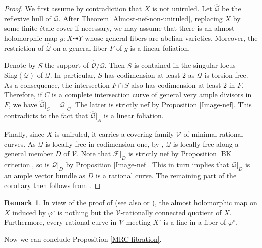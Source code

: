 \documentclass[english,reqno]{amsart}
\newcommand\cV{{\mathcal V}}
\newcommand\sF{{\mathscr F}}
\newcommand\sQ{{\mathscr Q}}
\theoremstyle{plain}
\theoremstyle{definition}
\newtheorem{remark}[thm]{Remark}
\numberwithin{equation}{section} %
\begin{document}
\begin{proof}
    We first assume by contradiction that $X$ is not uniruled.  Let $\widehat{\sQ}$ be the reflexive hull of $\sQ$.  After Theorem \ref{Almost-nef-non-uniruled}, replacing $X$ by some finite \'etale cover if necessary, we may assume that there is an almost holomorphic map $g\colon X \dashrightarrow Y$ whose general fibers are   abelian varieties. Moreover,  the restriction of $ \widehat{\sQ}$ on a general fiber $F$ of $g$ is a linear foliation.

    Denote by $S$ the support of $\widehat{\sQ}/\sQ$. Then $S$ is contained in the singular locus $\mathrm{Sing}(\sQ)$ of $\sQ$. In particular, $S$ has codimension at least $2$ as $\sQ$ is torsion free.  As a consequence, the intersection $F\cap S$ also has codimension at least $2$ in $F$.  Therefore, if $C$ is a complete intersection curve of general very ample divisors in $F$,  we have $\widehat{\sQ}\vert_C = \sQ|_C$. The latter is strictly nef by Proposition \ref{Image-nef}.    This contradicts to the fact that $\widehat{\sQ}\vert_A$ is a linear foliation.

    Finally, since $X$ is uniruled, it carries a covering family $\cV$ of minimal rational curves.
    As $\sQ$ is locally free in codimension one, by \cite[II, Proposition 3.7]{Kollar1996},   $\sQ$ is locally free along a general member $D$ of $\cV$. Note that $\sF|_D$ is strictly nef  by Proposition \ref{BK criterion}, so is $\sQ\vert_D$   by Proposition \ref{Image-nef}.
    This in turn implies that $\sQ|_D$ is an ample vector bundle  as $D$ is a rational curve. The remaining part of the corollary then  follows   from \cite[Proposition 2.7]{AraujoDruelKovacs2008}.
\end{proof}

\begin{remark}\label{rmk:rc-quotient}
    In view of the proof of \cite{AraujoDruelKovacs2008} (see also \cite[Theorem 3.4]{Araujo2006} or \cite[Theorem 2.1]{Liu2019}), the almost holomorphic map on $X$ induced by $\varphi^\circ$ is nothing but   the $\cV$-rationally connected quotient of $X$. Furthermore, every rational curve in $\cV$  meeting $X^\circ$ is a line in a fiber of $\varphi^\circ$.
\end{remark}



Now we can conclude Proposition \ref{MRC-fibration}.
\end{document}
